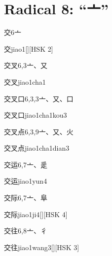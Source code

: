 
\section*{Radical 8: ``⼇''}

\begin{entry}{交}{6}{⼇}
  \begin{phonetics}{交}{jiao1}[][HSK 2]
  \end{phonetics}
\end{entry}

\begin{entry}{交叉}{6,3}{⼇、⼜}
  \begin{phonetics}{交叉}{jiao1cha1}
  \end{phonetics}
\end{entry}

\begin{entry}{交叉口}{6,3,3}{⼇、⼜、⼝}
  \begin{phonetics}{交叉口}{jiao1cha1kou3}
  \end{phonetics}
\end{entry}

\begin{entry}{交叉点}{6,3,9}{⼇、⼜、⽕}
  \begin{phonetics}{交叉点}{jiao1cha1dian3}
  \end{phonetics}
\end{entry}

\begin{entry}{交运}{6,7}{⼇、⾡}
  \begin{phonetics}{交运}{jiao1yun4}
  \end{phonetics}
\end{entry}

\begin{entry}{交际}{6,7}{⼇、⾩}
  \begin{phonetics}{交际}{jiao1ji4}[][HSK 4]
  \end{phonetics}
\end{entry}

\begin{entry}{交往}{6,8}{⼇、⼻}
  \begin{phonetics}{交往}{jiao1wang3}[][HSK 3]
  \end{phonetics}
\end{entry}

